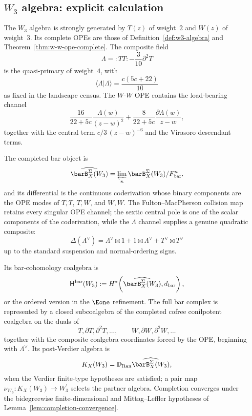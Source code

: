
\subsection{\texorpdfstring{$W_3$ algebra: explicit calculation}{W-3 algebra: explicit calculation}}

\begin{example}
\label{ex:w3-completion-full}
The $W_3$ algebra is strongly generated by $T(z)$ of weight~$2$ and
$W(z)$ of weight~$3$. Its complete OPEs are those of
Definition~\ref{def:w3-algebra} and Theorem~\ref{thm:w-w-ope-complete}.
The composite field
\[
\Lambda={:}TT{:}-\frac{3}{10}\partial^2T
\]
is the quasi-primary of weight~$4$, with
\[
\langle\Lambda|\Lambda\rangle=\frac{c(5c+22)}{10}
\]
as fixed in the landscape census. The $W$-$W$ OPE contains the
load-bearing channel
\[
\frac{16}{22+5c}\frac{\Lambda(w)}{(z-w)^2}
+\frac{8}{22+5c}\frac{\partial\Lambda(w)}{z-w},
\]
together with the central term $c/3\,(z-w)^{-6}$ and the Virasoro
descendant terms.

The completed bar object is
\[
\widehat{\barB_X^\Sigma(W_3)}
=\varprojlim_n\barB_X^\Sigma(W_3)/F^n_{\mathrm{bar}},
\]
and its differential is the continuous coderivation whose binary
components are the OPE modes of $T,T$, $T,W$, and $W,W$.  The
Fulton--MacPherson collision map retains every singular OPE channel;
the sextic central pole is one of the scalar
components of the coderivation, while the $\Lambda$ channel supplies a
genuine quadratic composite:
\[
\Delta(\Lambda^\vee)
=\Lambda^\vee\boxtimes 1+1\boxtimes\Lambda^\vee
+T^\vee\boxtimes T^\vee
\]
up to the standard suspension and normal-ordering signs.

Its bar-cohomology coalgebra is
\[
\mathsf H^{\mathrm{bar}}(W_3)
:=H^*\!\left(\widehat{\barB_X^\Sigma(W_3)},d_{\mathrm{bar}}\right),
\]
or the ordered version in the $\Eone$ refinement. The full bar complex
is represented by a closed subcoalgebra of the completed cofree
conilpotent coalgebra on the duals of
\[
T,\partial T,\partial^2T,\ldots,\qquad
W,\partial W,\partial^2W,\ldots
\]
together with the composite coalgebra coordinates forced by the OPE,
beginning with $\Lambda^\vee$. Its post-Verdier algebra is
\[
K_X(W_3)=\mathbb D_{\operatorname{Ran}}
\widehat{\barB_X^\Sigma(W_3)},
\]
when the Verdier finite-type hypotheses are satisfied; a pair map
$\nu_{W_3}\colon K_X(W_3)\to W_3^!$ selects the partner algebra.
Completion converges under the bidegreewise finite-dimensional and
Mittag--Leffler hypotheses of Lemma~\ref{lem:completion-convergence}.
\end{example}

